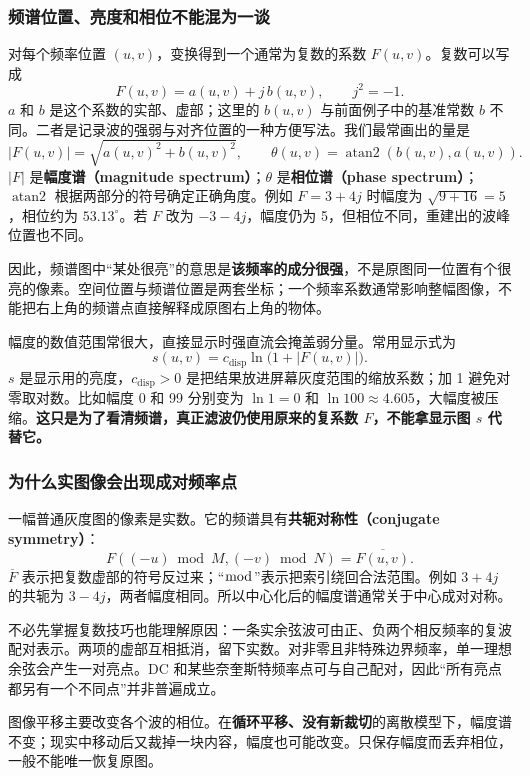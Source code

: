 \subsubsection{频谱位置、亮度和相位不能混为一谈}
对每个频率位置 $(u,v)$，变换得到一个通常为复数的系数 $F(u,v)$。复数可以写成
\[
F(u,v)=a(u,v)+j\,b(u,v),\qquad j^2=-1.
\]
$a$ 和 $b$ 是这个系数的实部、虚部；这里的 $b(u,v)$ 与前面例子中的基准常数 $b$ 不同。二者是记录波的强弱与对齐位置的一种方便写法。我们最常画出的量是
\[
|F(u,v)|=\sqrt{a(u,v)^2+b(u,v)^2},
\qquad
\theta(u,v)=\operatorname{atan2}(b(u,v),a(u,v)).
\]
$|F|$ 是\textbf{幅度谱（magnitude spectrum）}；$\theta$ 是\textbf{相位谱（phase spectrum）}；$\operatorname{atan2}$ 根据两部分的符号确定正确角度。例如 $F=3+4j$ 时幅度为 $\sqrt{9+16}=5$，相位约为 $53.13^\circ$。若 $F$ 改为 $-3-4j$，幅度仍为 5，但相位不同，重建出的波峰位置也不同。

因此，频谱图中“某处很亮”的意思是\textbf{该频率的成分很强}，不是原图同一位置有个很亮的像素。空间位置与频谱位置是两套坐标；一个频率系数通常影响整幅图像，不能把右上角的频谱点直接解释成原图右上角的物体。

幅度的数值范围常很大，直接显示时强直流会掩盖弱分量。常用显示式为
\[
s(u,v)=c_{\mathrm{disp}}\ln\bigl(1+|F(u,v)|\bigr).
\]
$s$ 是显示用的亮度，$c_{\mathrm{disp}}>0$ 是把结果放进屏幕灰度范围的缩放系数；加 1 避免对零取对数。比如幅度 0 和 99 分别变为 $\ln 1=0$ 和 $\ln100\approx4.605$，大幅度被压缩。\textbf{这只是为了看清频谱，真正滤波仍使用原来的复系数 $F$，不能拿显示图 $s$ 代替它。}

\subsubsection{为什么实图像会出现成对频率点}
一幅普通灰度图的像素是实数。它的频谱具有\textbf{共轭对称性（conjugate symmetry）}：
\[
F((-u)\bmod M,(-v)\bmod N)=\overline{F(u,v)}.
\]
$\overline{F}$ 表示把复数虚部的符号反过来；“$\bmod$”表示把索引绕回合法范围。例如 $3+4j$ 的共轭为 $3-4j$，两者幅度相同。所以中心化后的幅度谱通常关于中心成对对称。

不必先掌握复数技巧也能理解原因：一条实余弦波可由正、负两个相反频率的复波配对表示。两项的虚部互相抵消，留下实数。对非零且非特殊边界频率，单一理想余弦会产生一对亮点。DC 和某些奈奎斯特频率点可与自己配对，因此“所有亮点都另有一个不同点”并非普遍成立。

图像平移主要改变各个波的相位。在\textbf{循环平移、没有新裁切}的离散模型下，幅度谱不变；现实中移动后又裁掉一块内容，幅度也可能改变。只保存幅度而丢弃相位，一般不能唯一恢复原图。

